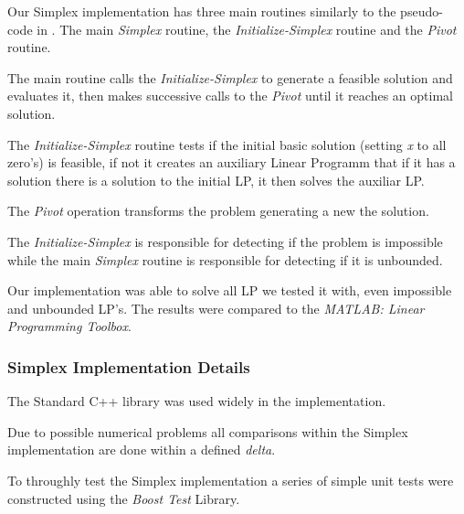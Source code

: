 Our Simplex implementation has three main routines similarly to the pseudo-code in \cite{Cormen}. The main \emph{Simplex} routine, the \emph{Initialize-Simplex} routine and the \emph{Pivot} routine.

The main routine calls the \emph{Initialize-Simplex} to generate a feasible solution and evaluates it, then makes successive calls to the \emph{Pivot} until it reaches an optimal solution.

The \emph{Initialize-Simplex} routine tests if the initial basic solution (setting \emph{x} to all zero's) is feasible, if not it creates an auxiliary Linear Programm that if it has a solution there is a solution to the initial LP, it then solves the auxiliar LP.

The \emph{Pivot} operation transforms the problem generating a new the solution.

The \emph{Initialize-Simplex} is responsible for detecting if the problem is impossible while the main \emph{Simplex} routine is responsible for detecting if it is unbounded.

Our implementation was able to solve all LP we tested it with, even impossible and unbounded LP's. The results were compared to the \emph{MATLAB: Linear Programming Toolbox}.

\subsubsection{Simplex Implementation Details}
\label{subs:SimplexImplementationDetails}

The Standard C++ library was used widely in the implementation. %

Due to possible numerical problems all comparisons within the Simplex implementation are done within a defined \emph{delta}.

To throughly test the Simplex implementation a series of simple unit tests were constructed using the \emph{Boost Test} Library.
